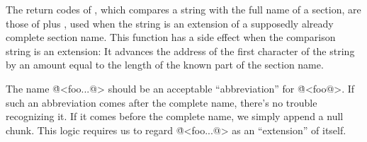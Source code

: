The return codes of , which compares a string
with
the full name of a section, are those of  plus
, used when the string is an extension of a
supposedly already complete section name.  This function has a side
effect when the comparison string is an extension: It advances the
address of the first character of the string by an amount equal to
the length of the known part of the section name.

The name \.{@<foo...@>} should be an acceptable ``abbreviation''
for \.{@<foo@>}. If such an abbreviation comes after the complete
name, there's no trouble recognizing it. If it comes before the
complete name, we simply append a null chunk. This logic requires
us to regard \.{@<foo...@>} as an ``extension'' of itself.

